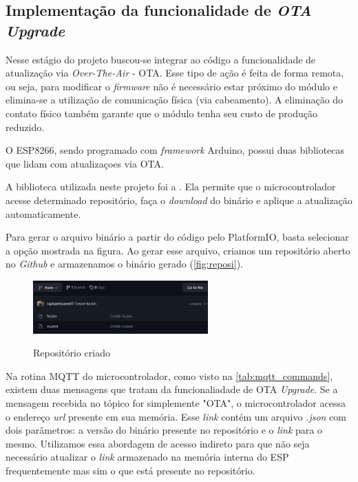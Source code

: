 \subsection{Implementação da funcionalidade de \textit{OTA Upgrade}}

Nesse estágio do projeto buscou-se integrar ao código a funcionalidade de atualização via \textit{Over-The-Air} - OTA. Esse tipo de ação é feita de forma remota, ou seja, para modificar o \textit{firmware} não é necessário estar próximo do módulo e elimina-se a utilização de comunicação física (via cabeamento). A eliminação do contato físico também garante que o módulo tenha seu custo de produção reduzido.

O ESP8266, sendo programado com \textit{framework} Arduino, possui duas bibliotecas que lidam com atualizaçoes via OTA.

A biblioteca utilizada neste projeto foi a . Ela permite que o microcontrolador acesse determinado repositório, faça o \textit{download} do binário e aplique a atualização automaticamente.

Para gerar o arquivo binário a partir do código pelo PlatformIO, basta selecionar a opção mostrada na figura. Ao gerar esse arquivo, criamos um repositório aberto no \textit{Github} e armazenamos o binário gerado (\autoref{fig:reposi}).

\begin{figure}[H]
	\centering
	\caption{Repositório criado}
	\includegraphics[width=0.6\textwidth]{figuras/repositorio_bin.png}
	\label{fig:reposi}
\end{figure}



Na rotina MQTT do microcontrolador, como visto na \autoref{tab:mqtt_commands}, existem duas mensagens que tratam da funcionaliadade de OTA \textit{Upgrade}. Se a mensagem recebida no tópico for simplemente "OTA", o microcontrolador acessa o endereço \textit{url} presente em sua memória. Esse \textit{link} contém um arquivo \textit{.json} com dois parâmetros: a versão do binário presente no repositório e o \textit{link} para o mesmo. Utilizamos essa abordagem de acesso indireto para que não seja necessário atualizar o \textit{link} armazenado na memória interna do ESP frequentemente mas sim o que está presente no repositório.

